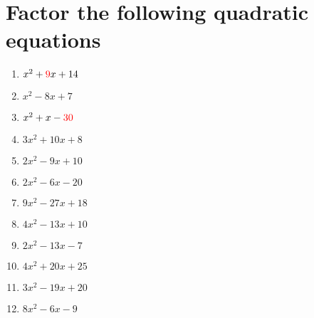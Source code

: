 \documentclass[12pt]{article}
\begin{document}
\section*{Factor the following quadratic equations}
\begin{minipage}[t]{0.45\textwidth}
    \begin{enumerate}[label=\#\arabic*]
        \setcounter{enumi}{0} %
        \item  $x^2+{\color{red} 9}x+14$
        \vspace{1em}
        \item  $x^2-8x+7$
        \vspace{1em}
        \item  $x^2+x-{\color{red} 30}$
        \vspace{1em}
        \item  $3x^2+10x+8$
        \vspace{1em}
        \item  $2x^2-9x+10$
        \vspace{1em}
        \item  $2x^2-6x-20$
        \end{enumerate}
\end{minipage}%
\hspace{1cm}
\begin{minipage}[t]{0.45\textwidth}
    \begin{enumerate}[label=\#\arabic*]
        \setcounter{enumi}{6} %
        \item  $9x^2-27x+18$
        \vspace{1em}
        \item  $4x^2-13x+10$
        \vspace{1em}
        \item  $2x^2-13x-7$
        \vspace{1em}
        \item  $4x^2+20x+25$
        \vspace{1em}
        \item  $3x^2-19x+20$
        \vspace{1em}
        \item  $8x^2-6x-9$

    \end{enumerate}
\end{minipage}

\begin{comment}
Notes:
- make ++ to ++, -- to +- table etc
- double check forms
- connect to zeros
- similar thing but a is not 1 as before
- show how graph is affected
- (x-m)(x-n) to (x+m)(x+n)
- backwards and expand to quadratic
- factor vs quadratic formula worksheet
\end{comment}
\end{document}
